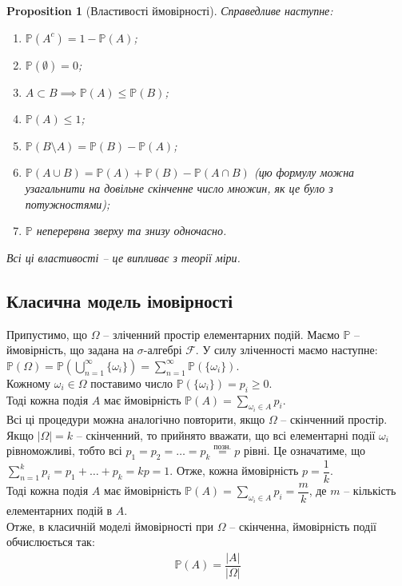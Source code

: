 \documentclass[a4paper, 10pt]{article}
\theoremstyle{theoremdd}
\newtheorem{proposition}[theorem]{Proposition}
\begin{document}
\begin{proposition}[Властивості ймовірності]
Справедливе наступне:
\begin{enumerate}[nosep,wide=0pt,label={\arabic*)}]
\item $\mathbb{P}(A^c) = 1 - \mathbb{P}(A)$;
\item $\mathbb{P}(\emptyset) = 0$;
\item $A \subset B \implies \mathbb{P}(A) \leq \mathbb{P}(B)$;
\item $\mathbb{P}(A) \leq 1$;
\item $\mathbb{P}(B \setminus A) = \mathbb{P}(B) - \mathbb{P}(A)$;
\item $\mathbb{P}(A \cup B) = \mathbb{P}(A) + \mathbb{P}(B) - \mathbb{P}(A \cap B)$ (цю формулу можна узагальнити на довільне скінченне число множин, як це було з потужностями);
\item $\mathbb{P}$ неперервна зверху та знизу одночасно.
\end{enumerate}
\textit{Всі ці властивості -- це випливає з теорії міри.}
\end{proposition}

\subsection{Класична модель імовірності}
Припустимо, що $\Omega$ -- зліченний простір елементарних подій. Маємо $\mathbb{P}$ -- ймовірність, що задана на $\sigma$-алгебрі $\mathcal{F}$. У силу зліченності маємо наступне:\\
$\mathbb{P}(\Omega) = \displaystyle \mathbb{P}\left( \bigcup_{n=1}^\infty \{\omega_i\} \right) = \sum_{n=1}^\infty \mathbb{P}(\{\omega_i\})$.\\
Кожному $\omega_i \in \Omega$ поставимо число $\mathbb{P}(\{\omega_i\}) = p_i \geq 0$.\\
Тоді кожна подія $A$ має ймовірність $\mathbb{P}(A) = \displaystyle\sum_{\omega_i \in A} p_i$.
\bigskip \\
Всі ці процедури можна аналогічно повторити, якщо $\Omega$ -- скінченний простір.\\
Якщо $|\Omega| = k$ -- скінченний, то прийнято вважати, що всі елементарні події $\omega_i$ рівноможливі, тобто всі $p_1 = p_2 = \dots = p_k \overset{\text{позн.}}{=} p$ рівні. Це означатиме, що $\displaystyle\sum_{n=1}^k p_i = p_1 + \dots + p_k = k p = 1$. Отже, кожна ймовірність $p = \dfrac{1}{k}$.\\
Тоді кожна подія $A$ має ймовірність $\mathbb{P}(A) = \displaystyle\sum_{\omega_i \in A} p_i = \dfrac{m}{k}$, де $m$ -- кількість елементарних подій в $A$.\\
Отже, в класичній моделі ймовірності при $\Omega$ -- скінченна, ймовірність події обчислюється так:
\begin{align*}
\mathbb{P}(A) = \dfrac{|A|}{|\Omega|}
\end{align*}
\end{document}
